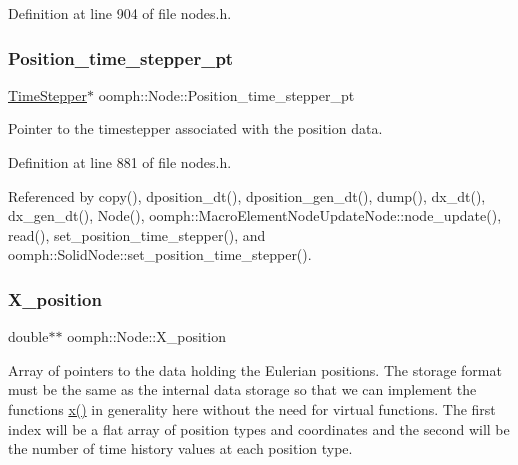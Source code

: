 Definition at line 904 of file nodes.\+h.

\mbox{\label{classoomph_1_1Node_a8cf734873ab29a412289f8ac2d3be348}} 
\subsubsection{\texorpdfstring{Position\+\_\+time\+\_\+stepper\+\_\+pt}{Position\_time\_stepper\_pt}}
{\footnotesize\ttfamily \hyperlink{classoomph_1_1TimeStepper}{Time\+Stepper}$\ast$ oomph\+::\+Node\+::\+Position\+\_\+time\+\_\+stepper\+\_\+pt\hspace{0.3cm}{\ttfamily [protected]}}



Pointer to the timestepper associated with the position data. 



Definition at line 881 of file nodes.\+h.



Referenced by copy(), dposition\+\_\+dt(), dposition\+\_\+gen\+\_\+dt(), dump(), dx\+\_\+dt(), dx\+\_\+gen\+\_\+dt(), Node(), oomph\+::\+Macro\+Element\+Node\+Update\+Node\+::node\+\_\+update(), read(), set\+\_\+position\+\_\+time\+\_\+stepper(), and oomph\+::\+Solid\+Node\+::set\+\_\+position\+\_\+time\+\_\+stepper().

\mbox{\label{classoomph_1_1Node_a908941e709ac28995147ab090f2cbf90}} 
\subsubsection{\texorpdfstring{X\+\_\+position}{X\_position}}
{\footnotesize\ttfamily double$\ast$$\ast$ oomph\+::\+Node\+::\+X\+\_\+position\hspace{0.3cm}{\ttfamily [protected]}}



Array of pointers to the data holding the Eulerian positions. The storage format must be the same as the internal data storage so that we can implement the functions \hyperlink{classoomph_1_1Node_a056f8e82da938369cd38541c5cdc598a}{x()} in generality here without the need for virtual functions. The first index will be a flat array of position types and coordinates and the second will be the number of time history values at each position type. 



